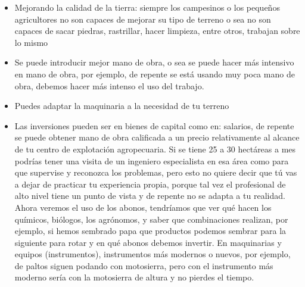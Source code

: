 \documentclass[
  letterpaper,
  DIV=11,
  numbers=noendperiod]{scrartcl}
\begin{document}
\begin{itemize}
\item
  Mejorando la calidad de la tierra: siempre los campesinos o los
  pequeños agricultores no son capaces de mejorar su tipo de terreno o
  sea no son capaces de sacar piedras, rastrillar, hacer limpieza, entre
  otros, trabajan sobre lo mismo
\item
  Se puede introducir mejor mano de obra, o sea se puede hacer más
  intensivo en mano de obra, por ejemplo, de repente se está usando muy
  poca mano de obra, debemos hacer más intenso el uso del trabajo.
\item
  Puedes adaptar la maquinaria a la necesidad de tu terreno
\item
  Las inversiones pueden ser en bienes de capital como en: salarios, de
  repente se puede obtener mano de obra calificada a un precio
  relativamente al alcance de tu centro de explotación agropecuaria. Si
  se tiene 25 a 30 hectáreas a mes podrías tener una visita de un
  ingeniero especialista en esa área como para que supervise y reconozca
  los problemas, pero esto no quiere decir que tú vas a dejar de
  practicar tu experiencia propia, porque tal vez el profesional de alto
  nivel tiene un punto de vista y de repente no se adapta a tu realidad.
  Ahora veremos el uso de los abonos, tendríamos que ver qué hacen los
  químicos, biólogos, los agrónomos, y saber que combinaciones realizan,
  por ejemplo, si hemos sembrado papa que productos podemos sembrar para
  la siguiente para rotar y en qué abonos debemos invertir. En
  maquinarias y equipos (instrumentos), instrumentos más modernos o
  nuevos, por ejemplo, de paltos siguen podando con motosierra, pero con
  el instrumento más moderno sería con la motosierra de altura y no
  pierdes el tiempo.
\end{itemize}
\end{document}
